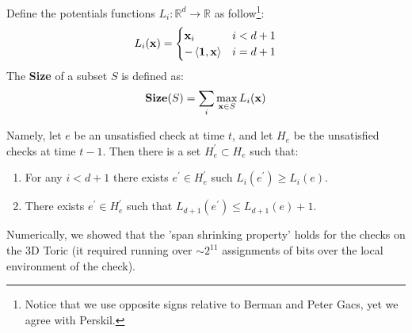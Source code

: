 Define the potentials functions $L_{i} \colon \mathbb{R}^{d} \rightarrow \mathbb{R}$ as follow\footnote{Notice that we use opposite signs relative to Berman and Peter Gacs, yet we agree with Perskil.}: 
\begin{equation*}
  \begin{split}
L_{i}(\mathbf{x}{}) =    \begin{cases}
  \mathbf{x}{}_{i} & i < d + 1 \\ 
  - \braket{\mathbf{1}, \mathbf{x}{}} & i = d+1
\end{cases}
  \end{split}
\end{equation*}
The \textbf{Size} of a subset $S$ is defined as:   
\begin{equation*}
  \begin{split}
  \mathbf{Size}(S) = \sum_{i}\max_{\mathbf{x}{} \in S} L_{i}(\mathbf{x}{})
  \end{split}
\end{equation*}
\begin{claim}
 Namely, let $e$ be an unsatisfied check at time $t$, and let $H_{e}$ be the unsatisfied checks at time $t-1$. Then there is a set $H^{\prime}_{e} \subset H_{e}$ such that:
\begin{enumerate}
  \item For any $i < d + 1$ there exists $e^{\prime} \in H^{\prime}_{e}$ such $L_{i}(e^{\prime}) \ge L_{i}(e)$. 
  \item There exists $e^{\prime} \in H^{\prime}_{e}$ such that $L_{d+1}(e^{\prime}) \le L_{d+1}(e) + 1 $. 
\end{enumerate}
\end{claim}
\begin{remark}
Numerically, we showed that the 'span shrinking property' holds for the checks on the 3D Toric (it required running over $\sim 2^{11}$ assignments of bits over the local environment of the check).
\end{remark}
